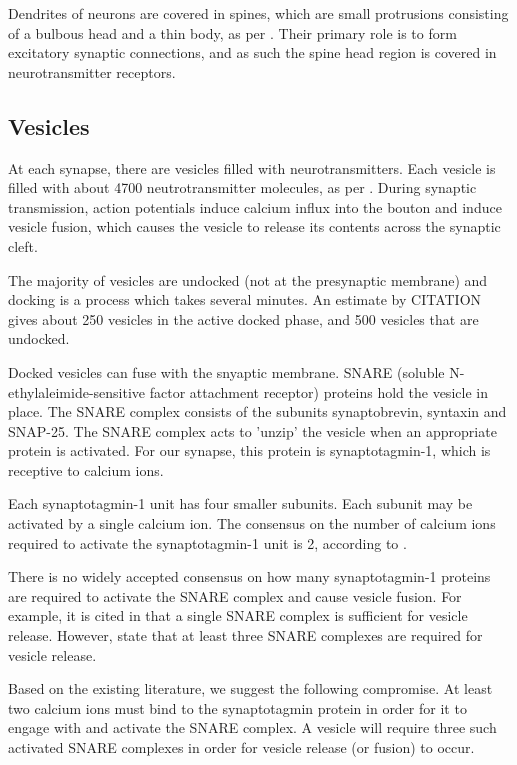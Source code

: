 \documentclass[a4paper]{article}
\begin{document}
Dendrites of neurons are covered in spines, which are small protrusions consisting of a bulbous head and a thin body, as per \cite{Arellano:FrontNeurosci:2007}. Their primary role is to form excitatory synaptic connections, and as such the spine head region is covered in neurotransmitter receptors.

\subsection{Vesicles}
At each synapse, there are vesicles filled with neurotransmitters. Each vesicle is filled with about 4700 neutrotransmitter molecules, as per \cite{Bruns:Nature:1995}. During synaptic transmission, action potentials induce calcium influx into the bouton and induce vesicle fusion, which causes the vesicle to release its contents across the synaptic cleft.

The majority of vesicles are undocked (not at the presynaptic membrane) and docking is a process which takes several minutes. An estimate by CITATION gives about 250 vesicles in the active docked phase, and 500 vesicles that are undocked.

Docked vesicles can fuse with the snyaptic membrane. SNARE (soluble N-ethylaleimide-sensitive factor attachment receptor) proteins hold the vesicle in place. The SNARE complex consists of the subunits synaptobrevin, syntaxin and SNAP-25. The SNARE complex acts to 'unzip' the vesicle when an appropriate protein is activated. For our synapse, this protein is synaptotagmin-1, which is receptive to calcium ions. 

Each synaptotagmin-1 unit has four smaller subunits. Each subunit may be activated by a single calcium ion. The consensus on the number of calcium ions required to activate the synaptotagmin-1 unit is 2, according to \cite{Dittrich:BiophysJ:2013}.

There is no widely accepted consensus on how many synaptotagmin-1 proteins are required to activate the SNARE complex and cause vesicle fusion. For example, it is cited in \cite{vandenBogaart:NatStructMolBiol:2010} that a single SNARE complex is sufficient for vesicle release. However, \cite{Dittrich:BiophysJ:2013} state that at least three SNARE complexes are required for vesicle release.

Based on the existing literature, we suggest the following compromise. At least two calcium ions must bind to the synaptotagmin protein in order for it to engage with and activate the SNARE complex. A vesicle will require three such activated SNARE complexes in order for vesicle release (or fusion) to occur.
\end{document}
